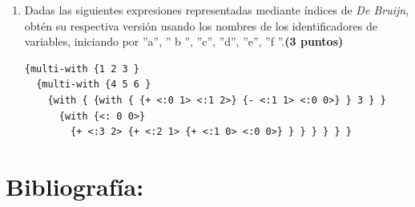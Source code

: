 \documentclass[11pt]{article}
\begin{document}
\begin{enumerate}[leftmargin=0.8cm]
    \item Dadas las siguientes expresiones representadas mediante índices de \textit{De Bruijn}, obtén su respectiva versión usando los nombres de los identificadores de variables, iniciando por ”a”, ” b ”, ”c”, ”d”, ”e”, ”f ”.\textbf{(3 puntos)}

    \begin{lstlisting}
{multi-with {1 2 3 }
  {multi-with {4 5 6 }
    {with { {with { {+ <:0 1> <:1 2>} {- <:1 1> <:0 0>} } 3 } }
      {with {<: 0 0>}
        {+ <:3 2> {+ <:2 1> {+ <:1 0> <:0 0>} } } } } } }
    \end{lstlisting}

\end{enumerate}

\section*{Bibliografía:}
 
\end{document}
